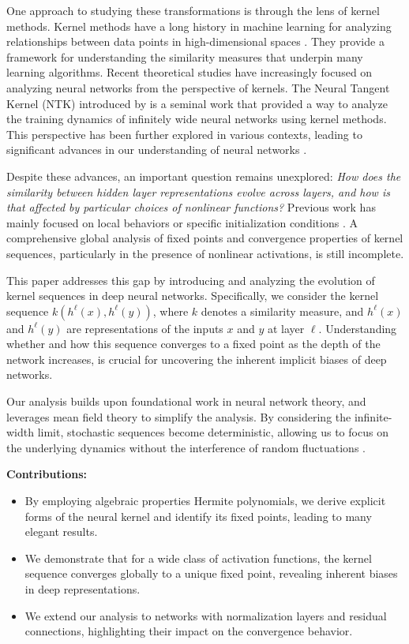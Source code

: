 \documentclass[twoside]{article}
\theoremstyle{definition}
\begin{document}
One approach to studying these transformations is through the lens of kernel methods. Kernel methods have a long history in machine learning for analyzing relationships between data points in high-dimensional spaces \citep{scholkopf2002learning, smola2004tutorial}. They provide a framework for understanding the similarity measures that underpin many learning algorithms. Recent theoretical studies have increasingly focused on analyzing neural networks from the perspective of kernels. The Neural Tangent Kernel (NTK) introduced by \citet{jacot2018neural} is a seminal work that provided a way to analyze the training dynamics of infinitely wide neural networks using kernel methods. This perspective has been further explored in various contexts, leading to significant advances in our understanding of neural networks \citep{lee2019wide, arora2019exact, yang2019scaling}.

Despite these advances, an important question remains unexplored: \emph{How does the similarity between hidden layer representations evolve across layers, and how is that affected by particular choices of nonlinear functions?} Previous work has mainly focused on local behaviors or specific initialization conditions \citep{saxe2013exact, schoenholz2016deep, pennington2017resurrecting}. A comprehensive global analysis of fixed points and convergence properties of kernel sequences, particularly in the presence of nonlinear activations, is still incomplete.

This paper addresses this gap by introducing and analyzing the evolution of kernel sequences in deep neural networks. Specifically, we consider the kernel sequence $k(h^\ell(x), h^\ell(y))$, where $k$ denotes a similarity measure, and $h^\ell(x)$ and $h^\ell(y)$ are representations of the inputs $x$ and $y$ at layer $\ell$. Understanding whether and how this sequence converges to a fixed point as the depth of the network increases, is crucial for uncovering the inherent implicit biases of deep networks.

Our analysis builds upon foundational work in neural network theory, and leverages mean field theory to simplify the analysis. By considering the infinite-width limit, stochastic sequences become deterministic, allowing us to focus on the underlying dynamics without the interference of random fluctuations \citep{poole2016exponential, yang2019meanfield, mei2019mean}.

\textbf{Contributions:} 
\begin{itemize}
    \item By employing algebraic properties Hermite polynomials, we derive explicit forms of the neural kernel and identify its fixed points, leading to many elegant results.  
    \item We demonstrate that for a wide class of activation functions, the kernel sequence converges globally to a unique fixed point, revealing inherent biases in deep representations. 
    \item We extend our analysis to networks with normalization layers and residual connections, highlighting their impact on the convergence behavior.
\end{itemize}
\end{document}
